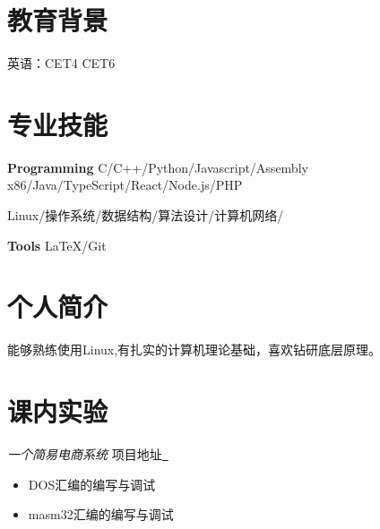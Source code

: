 \documentclass{uniquecv}
\begin{document}
\medskip



\section{教育背景}
\quad 英语：CET4 \quad CET6



\section{专业技能}
\smallskip
\textbf{Programming}
\quad C/C++/Python/Javascript/Assembly x86/Java/TypeScript/React/Node.js/PHP

Linux/操作系统/数据结构/算法设计/计算机网络/

\textbf{Tools} \quad \LaTeX/Git


\section{个人简介}

能够熟练使用Linux,有扎实的计算机理论基础，喜欢钻研底层原理。


\section{课内实验}

{\it 一个简易电商系统}
项目地址\quad \href{https://github.com/cheerryio/HHHHHHust-awful3/tree/assemblystore}{{\color{gray}{\faLink}}~}
\begin{itemize}
  \item DOS汇编的编写与调试
  \item masm32汇编的编写与调试
\end{itemize}
\end{document}
